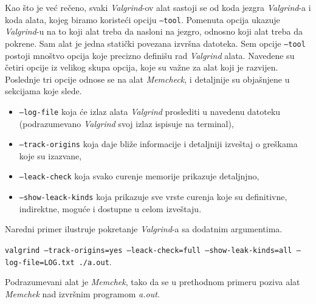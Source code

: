 \documentclass[12pt,oneside]{memoir}
\theoremstyle{plain}
\theoremstyle{definition}
\begin{document}
Kao što je već rečeno, svaki \textit{Valgrind}-ov alat sastoji se od koda jezgra \textit{Valgrind}-a i koda alata, kojeg biramo koristeći opciju \texttt{--tool}. Pomenuta opcija ukazuje \textit{Valgrind}-u na to koji alat treba da nasloni na jezgro, odnosno koji alat treba da pokrene. Sam alat je jedna statički povezana izvršna datoteka. Sem opcije \texttt{--tool} postoji mnoštvo opcija koje precizno definišu rad \textit{Valgrind} alata. Navedene su četiri opcije iz velikog skupa opcija, koje su važne za alat koji je razvijen. Poslednje tri opcije odnose se na alat \textit{Memcheck}, i detaljnije su objašnjene u sekcijama koje slede.
\begin{itemize}
\item \texttt{--log-file}  koja će izlaz alata \textit{Valgrind} proslediti u navedenu datoteku (podrazumevano \textit{Valgrind} svoj izlaz ispisuje na terminal),
\item \texttt{--track-origins} koja daje bliže informacije i detaljniji izveštaj o greškama koje su izazvane, 
\item \texttt{--leack-check} koja svako curenje memorije prikazuje detaljnjno,
\item \texttt{--show-leack-kinds} koja prikazuje sve vrste curenja koje su definitivne, indirektne, moguće i dostupne u celom izveštaju.
\end{itemize} 
Naredni primer ilustruje pokretanje \textit{Valgrind}-a sa dodatnim argumentima.
\begin{center}
\texttt{valgrind --track-origins=yes --leack-check=full --show-leak-kinds=all --log-file=LOG.txt ./a.out}.
\end{center}
Podrazumevani alat je \textit{Memchek}, tako da se u prethodnom primeru poziva alat \textit{Memchek} nad izvršnim programom \textit{a.out}.
\end{document}
